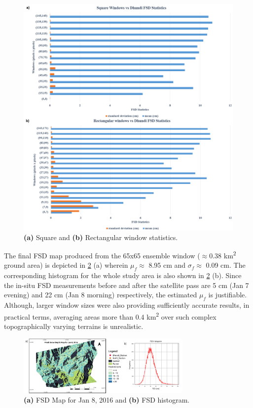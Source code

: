 \documentclass{article}
\begin{document}
\begin{figure}[htb]
\centering
\includegraphics[scale=0.149]{Pictures/Graphs.png}
\vspace{-2ex}
\caption{\textbf{(a)} Square and \textbf{(b)} Rectangular window statistics.}
\label{fig:fsd_graph}
\end{figure}

The final FSD map produced from the 65x65 ensemble window ($\approx$0.38 km\textsuperscript{2} ground area) is depicted in \ref{fig:fsd_map} (a) wherein $\mu_f \approx$ 8.95 cm and $\sigma_f \approx$ 0.09 cm. The corresponding histogram for the whole study area is also shown in \ref{fig:fsd_map} (b). Since the in-situ FSD measurements before and after the satellite pass are 5 cm (Jan 7 evening) and 22 cm (Jan 8 morning) respectively, the estimated $\mu_f$ is justifiable. Although, larger window sizes were also providing sufficiently accurate results, in practical terms, averaging areas more than 0.4 km\textsuperscript{2} over such complex topographically varying terrains is unrealistic.

\begin{figure}[htb]
\centering
\includegraphics[width=8.5cm]{Pictures/FSD_Map.png}
\vspace{-2ex}
\caption{\textbf{(a)} FSD Map for Jan 8, 2016 and \textbf{(b)} FSD histogram.}
\label{fig:fsd_map}
\end{figure}
\end{document}
